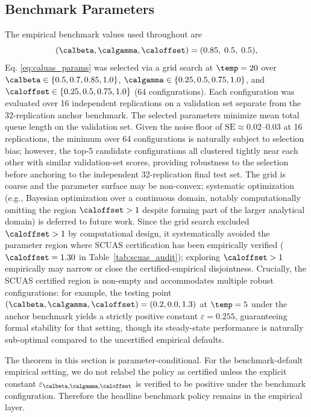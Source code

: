 \subsection{Benchmark Parameters}
The empirical benchmark values used throughout are
\begin{equation}
\label{eq:caluas_params}
(\calbeta, \calgamma, \caloffset) = (0.85,\; 0.5,\; 0.5),
\end{equation}
Eq. \eqref{eq:caluas_params} was selected via a grid search at $\temp=20$ over $\calbeta \in \{0.5, 0.7, 0.85, 1.0\}$, $\calgamma \in \{0.25, 0.5, 0.75, 1.0\}$, and $\caloffset \in \{0.25, 0.5, 0.75, 1.0\}$ (64 configurations).
Each configuration was evaluated over 16 independent replications on a validation set separate from the 32-replication anchor benchmark.
The selected parameters minimize mean total queue length on the validation set. Given the noise floor of $\mathrm{SE} \approx 0.02$--$0.03$ at 16 replications, the minimum over 64 configurations is naturally subject to selection bias; however, the top-5 candidate configurations all clustered tightly near each other with similar validation-set scores, providing robustness to the selection before anchoring to the independent 32-replication final test set.
The grid is coarse and the parameter surface may be non-convex; systematic optimization (e.g., Bayesian optimization over a continuous domain, notably computationally omitting the region $\caloffset > 1$ despite forming part of the larger analytical domain) is deferred to future work.
Since the grid search excluded $\caloffset > 1$ by computational design, it systematically avoided the parameter region where SCUAS certification has been empirically verified ($\caloffset = 1.30$ in Table~\ref{tab:scuas_audit}); exploring $\caloffset > 1$ empirically may narrow or close the certified-empirical disjointness.
Crucially, the SCUAS certified region is non-empty and accommodates multiple robust configurations: for example, the testing point $(\calbeta, \calgamma, \caloffset) = (0.2, 0.0, 1.3)$ at $\temp = 5$ under the anchor benchmark yields a strictly positive constant $\varepsilon = 0.255$, guaranteeing formal stability for that setting, though its steady-state performance is naturally sub-optimal compared to the uncertified empirical defaults.

The theorem in this section is parameter-conditional.
For the benchmark-default empirical setting, we do not relabel the policy as certified unless the explicit constant $\varepsilon_{\calbeta,\calgamma,\caloffset}$ is verified to be positive under the benchmark configuration.
Therefore the headline benchmark policy remains in the empirical layer.

